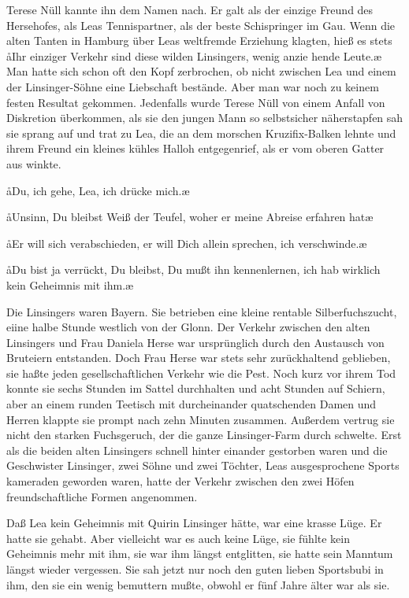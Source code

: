 Terese Nüll kannte ihn dem Namen nach. Er galt als der einzige
Freund des Hersehofes, als Leas Tennispartner, als der beste
Schispringer im Gau. Wenn die alten Tanten in Hamburg
über Leas weltfremde Erziehung klagten, hieß es stets\dopp{} \aa{}Ihr
einziger Verkehr sind diese wilden Linsingers, wenig anzie\-%
hende Leute.\ae{} Man hatte sich schon oft den Kopf zerbrochen,
ob nicht zwischen Lea und einem der Linsinger-Söhne eine
Liebschaft bestände. Aber man war noch zu keinem festen
Resultat gekommen. Jedenfalls wurde Terese Nüll von einem
Anfall von Diskretion überkommen, als sie den jungen Mann
so selbstsicher näherstapfen sah\dopp{} sie sprang auf und trat zu Lea,
die an dem morschen Kruzifix-Balken lehnte und ihrem
Freund ein kleines kühles Halloh entgegenrief, als er vom
oberen Gatter aus winkte.

\aa{}Du, ich gehe, Lea, ich drücke mich.\ae{}

\aa{}Unsinn, Du bleibst\ausr{} Weiß der Teufel, woher er meine Abreise
erfahren hat\ausr{}\ae{}

\aa{}Er will sich verabschieden, er will Dich allein sprechen, ich
verschwinde.\ae{}

\aa{}Du bist ja verrückt, Du bleibst, Du mußt ihn kennenlernen,
ich hab wirklich kein Geheimnis mit ihm.\ae{}

Die Linsingers waren Bayern. Sie betrieben eine kleine
rentable Silberfuchszucht, eiine halbe Stunde westlich von
der Glonn. Der Verkehr zwischen den alten Linsingers und
Frau Daniela Herse war ursprünglich durch den Austausch
von Bruteiern entstanden. Doch Frau Herse war stets sehr
zurückhaltend geblieben, sie haßte jeden gesellschaftlichen
Verkehr wie die Pest. Noch kurz vor ihrem Tod konnte sie
sechs Stunden im Sattel durchhalten und acht Stunden auf
Schiern, aber an einem runden Teetisch mit durcheinander\-%
quatschenden Damen und Herren klappte sie prompt nach
zehn Minuten zusammen. Außerdem vertrug sie nicht den
starken Fuchsgeruch, der die ganze Linsinger-Farm durch\-%
schwelte. Erst als die beiden alten Linsingers schnell hinter\-%
einander gestorben waren und die Geschwister Linsinger,
zwei Söhne und zwei Töchter, Leas ausgesprochene Sports\-%
kameraden geworden waren, hatte der Verkehr zwischen den
zwei Höfen freundschaftliche Formen angenommen.

Daß Lea kein Geheimnis mit Quirin Linsinger hätte, war eine
krasse Lüge. Er hatte sie gehabt. Aber vielleicht war es auch
keine Lüge, sie fühlte kein Geheimnis mehr mit ihm, sie war
ihm längst entglitten, sie hatte sein Manntum längst wieder
vergessen. Sie sah jetzt nur noch den guten lieben Sportsbubi
in ihm, den sie ein wenig bemuttern mußte, obwohl er fünf
Jahre älter war als sie.

